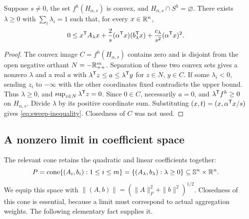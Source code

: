 \begin{lemma}\label{lem:hyperplane-certificate}
Suppose $s\ne0$, the set $f^h(H_{\alpha,s})$ is convex, and
$H_{\alpha,s}\cap S^h=\varnothing$. There exists $\lambda\geq0$ with
$\sum_i\lambda_i=1$ such that, for every $x\in\mathbb R^n$,
\begin{equation}\label{eq:sweep-inequality}
 0\leq x^{\mathsf T} A_\lambda x
       +\frac{2}{s}(\alpha^{\mathsf T} x)(b_\lambda^{\mathsf T} x)
       +\frac{c_\lambda}{s^2}(\alpha^{\mathsf T} x)^2.
\end{equation}
\end{lemma}
\begin{proof}
The convex image $C=f^h(H_{\alpha,s})$ contains zero and is disjoint
from the open negative orthant $N=-\mathbb R^m_{++}$. Separation of these two
convex sets gives a nonzero $\lambda$ and a real $a$ with
$\lambda^{\mathsf T} z\leq a\leq\lambda^{\mathsf T} y$ for $z\in N$,
$y\in C$. If some $\lambda_i<0$, sending $z_i$ to $-\infty$ with
the other coordinates fixed contradicts the upper bound. Thus
$\lambda\geq0$, and $\sup_{z\in N}\lambda^{\mathsf T} z=0$.
Since $0\in C$, necessarily $a=0$, and
$\lambda^{\mathsf T} f^h\geq0$ on $H_{\alpha,s}$.
Divide $\lambda$ by its positive coordinate sum. Substituting
$(x,t)=(x,\alpha^{\mathsf T} x/s)$ gives \eqref{eq:sweep-inequality}.
Closedness of $C$ was not used.
\end{proof}

\subsection{A nonzero limit in coefficient space}

The relevant cone retains the quadratic and linear coefficients together:
\begin{equation}\label{eq:coefficient-cone}
 P=\operatorname{cone}\{(A_i,b_i):1\leq i\leq m\}
   =\{(A_\lambda,b_\lambda):\lambda\geq0\}
   \subseteq\mathbb S^n\times\mathbb R^n.
\end{equation}
We equip this space with
$\|(A,b)\|=(\|A\|_F^2+\|b\|^2)^{1/2}$.
Closedness of this cone is essential, because a limit must correspond
to actual aggregation weights. The following elementary fact supplies it.

